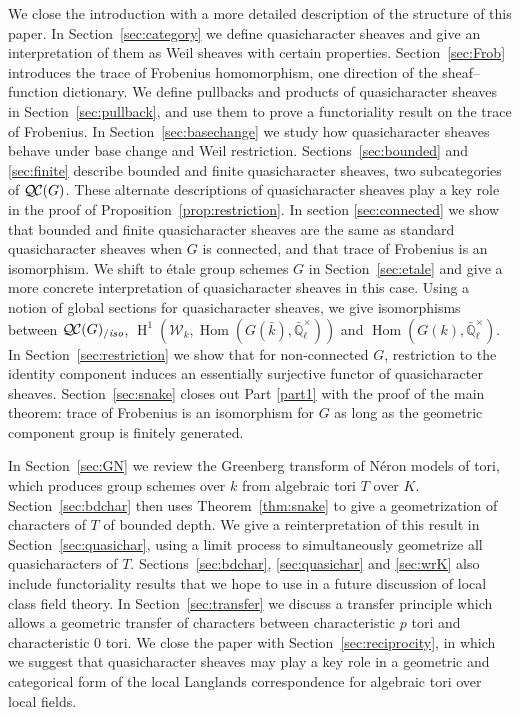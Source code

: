 \documentclass[11pt]{amsart}
\theoremstyle{plain}
\theoremstyle{definition}
\theoremstyle{remark}
\newcommand{\EE}{\mathbb{\bar Q}_\ell}
\newcommand{\bFq}{\bar{k}}
\newcommand{\Fq}{k}
\newcommand{\EEx}{\EE^\times}
\DeclareMathOperator{\Hom}{Hom}
\DeclareMathOperator{\Hh}{H}
\newcommand{\QC}{{\mathcal{Q\hskip-0.8pt C}}}
\newcommand{\QCiso}[1]{\QC(#1)_{/\textit{iso}}}
\newcommand{\Weil}[1]{\mathcal{W}_{#1}}
\begin{document}
We close the introduction with a more detailed description of the structure of this paper.
In Section~\ref{sec:category} we define quasicharacter sheaves and give an interpretation of
them as Weil sheaves with certain properties.
Section~\ref{sec:Frob} introduces the trace of Frobenius homomorphism,
one direction of the sheaf--function dictionary.
We define pullbacks and products of quasicharacter sheaves in Section~\ref{sec:pullback}, and use
them to prove a functoriality result on the trace of Frobenius.
In Section~\ref{sec:basechange} we study how quasicharacter sheaves behave under base change
and Weil restriction.
Sections~\ref{sec:bounded} and \ref{sec:finite} describe bounded and finite quasicharacter sheaves,
two subcategories of $\QC(G)$.  These alternate descriptions of quasicharacter sheaves play a key
role in the proof of Proposition~\ref{prop:restriction}.
In section \ref{sec:connected} we show that bounded and finite quasicharacter sheaves are the same
as standard quasicharacter sheaves when $G$ is connected, and that trace of Frobenius is an isomorphism.
We shift to \'etale group schemes $G$ in Section~\ref{sec:etale} and give a more concrete interpretation
of quasicharacter sheaves in this case.  Using a notion of global sections for quasicharacter sheaves,
we give isomorphisms between $\QCiso{G}$, $\Hh^1(\Weil{\Fq}, \Hom(G(\bFq), \EEx))$ and $\Hom(G(\Fq), \EEx)$.
In Section~\ref{sec:restriction} we show that for non-connected $G$, restriction to the identity component
induces an essentially surjective functor of quasicharacter sheaves.
Section~\ref{sec:snake} closes out Part \ref{part1} with the proof of the main theorem: trace of Frobenius
is an isomorphism for $G$ as long as the geometric component group is finitely generated.

In Section~\ref{sec:GN} we review the Greenberg transform of N\'eron models of tori, which produces
group schemes over $\Fq$ from algebraic tori $T$ over $K$.
Section~\ref{sec:bdchar} then uses Theorem~\ref{thm:snake} to give a geometrization of characters of $T$
of bounded depth.
We give a reinterpretation of this result in Section~\ref{sec:quasichar}, using a limit process to simultaneously
geometrize all quasicharacters of $T$.  Sections~\ref{sec:bdchar}, \ref{sec:quasichar} and \ref{sec:wrK} also include
functoriality results that we hope to use in a future discussion of 
local class field theory.
In Section~\ref{sec:transfer} we discuss a transfer principle which allows
a geometric transfer of characters between characteristic $p$ tori and characteristic $0$ tori.
We close the paper with Section~\ref{sec:reciprocity}, in which we suggest that quasicharacter
sheaves may play a key role in a geometric and categorical form of the local Langlands
correspondence for algebraic tori over local fields.
\end{document}
